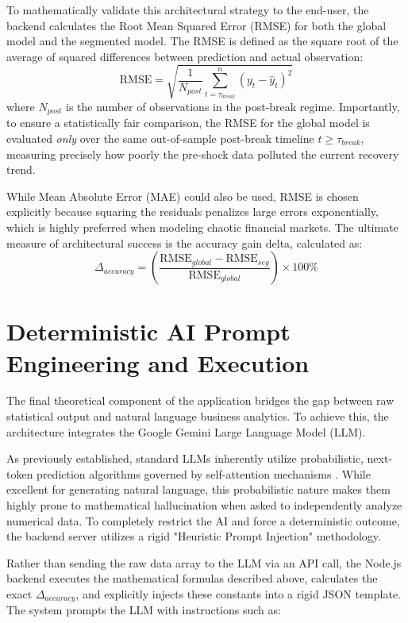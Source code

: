 To mathematically validate this architectural strategy to the end-user, the backend calculates the Root Mean Squared Error (RMSE) for both the global model and the segmented model. The RMSE is defined as the square root of the average of squared differences between prediction and actual observation:
\begin{equation}
    \text{RMSE} = \sqrt{ \frac{1}{N_{post}} \sum_{t=\tau_{break}}^{n} (y_t - \hat{y}_t)^2 }
\end{equation}
where $N_{post}$ is the number of observations in the post-break regime. Importantly, to ensure a statistically fair comparison, the RMSE for the global model is evaluated \textit{only} over the same out-of-sample post-break timeline $t \ge \tau_{break}$, measuring precisely how poorly the pre-shock data polluted the current recovery trend. 

While Mean Absolute Error (MAE) could also be used, RMSE is chosen explicitly because squaring the residuals penalizes large errors exponentially, which is highly preferred when modeling chaotic financial markets. The ultimate measure of architectural success is the accuracy gain delta, calculated as:
\begin{equation}
    \Delta_{accuracy} = \left( \frac{\text{RMSE}_{global} - \text{RMSE}_{seg}}{\text{RMSE}_{global}} \right) \times 100\%
\end{equation}

\section{Deterministic AI Prompt Engineering and Execution}
The final theoretical component of the application bridges the gap between raw statistical output and natural language business analytics. To achieve this, the architecture integrates the Google Gemini Large Language Model (LLM). 

As previously established, standard LLMs inherently utilize probabilistic, next-token prediction algorithms governed by self-attention mechanisms \cite{Vaswani2017}. While excellent for generating natural language, this probabilistic nature makes them highly prone to mathematical hallucination when asked to independently analyze numerical data. To completely restrict the AI and force a deterministic outcome, the backend server utilizes a rigid "Heuristic Prompt Injection" methodology. 

Rather than sending the raw data array to the LLM via an API call, the Node.js backend executes the mathematical formulas described above, calculates the exact $\Delta_{accuracy}$, and explicitly injects these constants into a rigid JSON template. The system prompts the LLM with instructions such as: 

